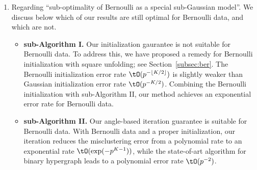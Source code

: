 \documentclass[11pt]{article}
\theoremstyle{definition}
\theoremstyle{definition}
\DeclarePairedDelimiter{\floor}{\lfloor}{\rfloor}
\begin{document}
\begin{enumerate}[wide, labelwidth=!, labelindent=0pt]
\begin{enumerate}
\item Regarding ``sub-optimality of Bernoulli as a special sub-Gaussian model''. We discuss below which of our results are still optimal for Bernoulli data, and which are not. 

\begin{itemize}
\item {\bf sub-Algorithm I.} Our initialization gaurantee is not suitable for Bernoulli data. To address this, we have proposed a remedy for Bernoulli initialization with square unfolding; see Section~\ref{subsec:ber}. The Bernoulli initialization error rate $\tO(p^{-\floor{K/2}})$ is slightly weaker than Gaussian initialization error rate $\tO(p^{-K/2})$. Combining the Bernoulli initialization with sub-Algorithm II, our method achieves an exponential error rate for Bernoulli data.

\item  {\bf sub-Algorithm II.} Our angle-based iteration guarantee is suitable for Bernoulli data. With Bernoulli data and a proper initialization, our iteration reduces the misclustering error from a polynomial rate to an exponential rate $\tO(\exp(-p^{K-1}))$, while the state-of-art algorithm for binary hypergraph \citep{ke2019community} leads to a polynomial error rate $\tO(p^{-2})$. 



\end{itemize}
\end{enumerate}
\end{enumerate}
\end{document}

